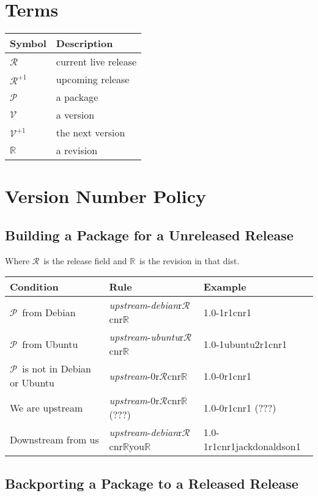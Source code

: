 \documentclass[11pt]{article}
\newcommand{\release}{\ensuremath{\mathcal{R}}}
\newcommand{\nextrelease}{\ensuremath{\mathcal{R}^{+1}}}
\newcommand{\version}{\ensuremath{\mathcal{V}}}
\newcommand{\nextversion}{\ensuremath{\mathcal{V}^{+1}}}
\newcommand{\package}{\ensuremath{\mathcal{P}}}
\newcommand{\revision}{\ensuremath{\mathbb{R}}}
\begin{document}
\section{Terms}

\begin{tabular}{|l|l|}
\hline
Symbol & Description \\
\hline
\hline
\release & current live release \\
\hline
\nextrelease & upcoming release \\
\hline 
\package & a package \\
\hline
\version & a version \\
\hline
\nextversion & the next version \\
\hline
\revision & a revision \\
\hline
\end{tabular}

\section{Version Number Policy}

\subsection{Building a Package for a Unreleased Release}

Where \release\ is the release field and \revision\ is the revision in that dist.

\noindent
\begin{tabular}{|l|l||l|}
\hline
Condition & Rule & Example \\
\hline
\hline
\package\ from Debian   &  \textit{upstream}-\textit{debian}r{\release}cnr\revision & 1.0-1r1cnr1 \\
\hline
\package\ from Ubuntu   &
\textit{upstream}-\textit{ubuntu}r{\release}cnr\revision & 1.0-1ubuntu2r1cnr1 \\
\hline
\package\ is not in Debian or Ubuntu &  \textit{upstream}-0r{\release}cnr\revision & 1.0-0r1cnr1 \\
\hline
We are upstream & \textit{upstream}-0r{\release}cnr\revision (???) & 1.0-0r1cnr1 (???) \\
\hline
Downstream from us & \textit{upstream}-\textit{debian}r\textit{\release}{cnr}\revision you\revision &  1.0-1r1cnr1jackdonaldson1 \\
\hline
\end{tabular}


\subsection{Backporting a Package to a Released Release}
\label{packagebackport}
\end{document}
